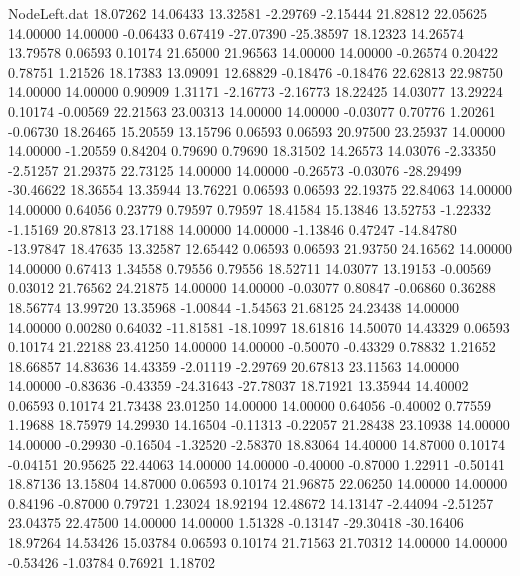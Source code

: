 \begin{filecontents}{NodeLeft.dat}
  18.07262   14.06433   13.32581    -2.29769   -2.15444   21.82812   22.05625   14.00000   14.00000   -0.06433    0.67419  -27.07390  -25.38597
  18.12323   14.26574   13.79578     0.06593    0.10174   21.65000   21.96563   14.00000   14.00000   -0.26574    0.20422    0.78751    1.21526
  18.17383   13.09091   12.68829    -0.18476   -0.18476   22.62813   22.98750   14.00000   14.00000    0.90909    1.31171   -2.16773   -2.16773
  18.22425   14.03077   13.29224     0.10174   -0.00569   22.21563   23.00313   14.00000   14.00000   -0.03077    0.70776    1.20261   -0.06730
  18.26465   15.20559   13.15796     0.06593    0.06593   20.97500   23.25937   14.00000   14.00000   -1.20559    0.84204    0.79690    0.79690
  18.31502   14.26573   14.03076    -2.33350   -2.51257   21.29375   22.73125   14.00000   14.00000   -0.26573   -0.03076  -28.29499  -30.46622
  18.36554   13.35944   13.76221     0.06593    0.06593   22.19375   22.84063   14.00000   14.00000    0.64056    0.23779    0.79597    0.79597
  18.41584   15.13846   13.52753    -1.22332   -1.15169   20.87813   23.17188   14.00000   14.00000   -1.13846    0.47247  -14.84780  -13.97847
  18.47635   13.32587   12.65442     0.06593    0.06593   21.93750   24.16562   14.00000   14.00000    0.67413    1.34558    0.79556    0.79556
  18.52711   14.03077   13.19153    -0.00569    0.03012   21.76562   24.21875   14.00000   14.00000   -0.03077    0.80847   -0.06860    0.36288
  18.56774   13.99720   13.35968    -1.00844   -1.54563   21.68125   24.23438   14.00000   14.00000    0.00280    0.64032  -11.81581  -18.10997
  18.61816   14.50070   14.43329     0.06593    0.10174   21.22188   23.41250   14.00000   14.00000   -0.50070   -0.43329    0.78832    1.21652
  18.66857   14.83636   14.43359    -2.01119   -2.29769   20.67813   23.11563   14.00000   14.00000   -0.83636   -0.43359  -24.31643  -27.78037
  18.71921   13.35944   14.40002     0.06593    0.10174   21.73438   23.01250   14.00000   14.00000    0.64056   -0.40002    0.77559    1.19688
  18.75979   14.29930   14.16504    -0.11313   -0.22057   21.28438   23.10938   14.00000   14.00000   -0.29930   -0.16504   -1.32520   -2.58370
  18.83064   14.40000   14.87000     0.10174   -0.04151   20.95625   22.44063   14.00000   14.00000   -0.40000   -0.87000    1.22911   -0.50141
  18.87136   13.15804   14.87000     0.06593    0.10174   21.96875   22.06250   14.00000   14.00000    0.84196   -0.87000    0.79721    1.23024
  18.92194   12.48672   14.13147    -2.44094   -2.51257   23.04375   22.47500   14.00000   14.00000    1.51328   -0.13147  -29.30418  -30.16406
  18.97264   14.53426   15.03784     0.06593    0.10174   21.71563   21.70312   14.00000   14.00000   -0.53426   -1.03784    0.76921    1.18702

\end{filecontents}
